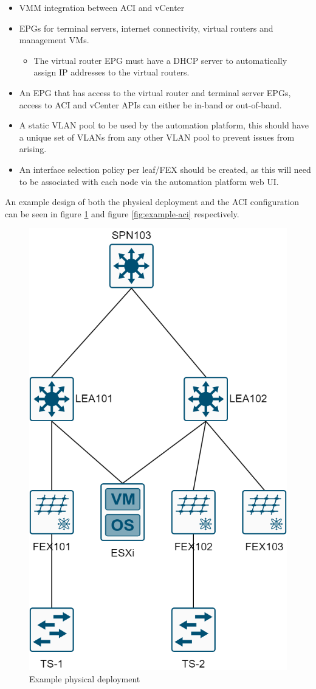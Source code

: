 \begin{itemize}
    \item VMM integration between ACI and vCenter
    \item EPGs for terminal servers, internet connectivity, virtual routers and management VMs.
          \begin{itemize}
              \item The virtual router EPG must have a DHCP server to automatically assign IP addresses to the virtual routers.
          \end{itemize}
    \item An EPG that has access to the virtual router and terminal server EPGs, access to ACI and vCenter APIs can either be in-band or out-of-band.
    \item A static VLAN pool to be used by the automation platform, this should have a unique set of VLANs from any other VLAN pool to prevent issues from arising.
    \item An interface selection policy per leaf/FEX should be created, as this will need to be associated with each node via the automation platform web UI.
\end{itemize}

An example design of both the physical deployment and the ACI configuration can be seen in figure \ref{fig:example-deployment} and figure \ref{fig:example-aci} respectively.

\begin{figure}[H]
    \centering
    \includegraphics[width=0.5\linewidth]{images/aci-topology.png}
    \caption{Example physical deployment}
    \label{fig:example-deployment}
\end{figure}

